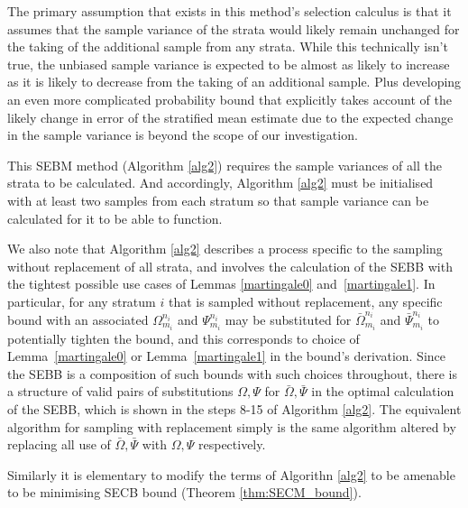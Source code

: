 The primary assumption that exists in this method's selection calculus is that it assumes that the sample variance of the strata would likely remain unchanged for the taking of the additional sample from any strata.
While this technically isn't true, the unbiased sample variance is expected to be almost as likely to increase as it is likely to decrease from the taking of an additional sample.
Plus developing an even more complicated probability bound that explicitly takes account of the likely change in error of the stratified mean estimate due to the expected change in the sample variance is beyond the scope of our investigation.

This SEBM method (Algorithm \ref{alg2}) requires the sample variances of all the strata to be calculated. And accordingly, Algorithm \ref{alg2} must be initialised with at least two samples from each stratum so that sample variance can be calculated for it to be able to function.

We also note that Algorithm \ref{alg2} describes a process specific to the sampling without replacement of all strata, and involves the calculation of the SEBB with the tightest possible use cases of Lemmas \ref{martingale0} and~\ref{martingale1}.
In particular, for any stratum $i$ that is sampled without replacement, any specific bound with an associated $\Omega_{m_i}^{n_i}$ and $\Psi_{m_i}^{n_i}$ may be substituted for $\bar{\Omega}_{m_i}^{n_i}$ and $\bar{\Psi}_{m_i}^{n_i}$ to potentially tighten the bound, and this corresponds to choice of Lemma~\ref{martingale0} or Lemma~\ref{martingale1} in the bound's derivation. 
Since the SEBB is a composition of such bounds with such choices throughout, there is a structure of valid pairs of substitutions $\Omega,\Psi$ for $\bar{\Omega},\bar{\Psi}$ in the optimal calculation of the SEBB, which is shown in the steps 8-15 of Algorithm \ref{alg2}.
The equivalent algorithm for sampling with replacement simply is the same algorithm altered by replacing all use of $\bar{\Omega},\bar{\Psi}$ with $\Omega,\Psi$ respectively.

Similarly it is elementary to modify the terms of Algorithn \ref{alg2} to be amenable to be minimising SECB bound (Theorem \ref{thm:SECM_bound}).

